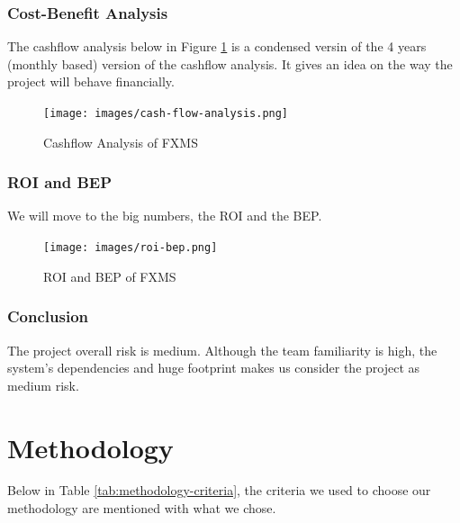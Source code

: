 \documentclass[a4paper]{report}
\begin{document}
\subsection{Cost-Benefit Analysis}

The cashflow analysis below in Figure \ref{fig:cash-flow-analysis} is a condensed versin of the 4 years (monthly based) version of the cashflow analysis. It gives an idea on the way the project will behave financially.

\begin{figure}[h!]
    \centering
    \texttt{[image: images/cash-flow-analysis.png]}
    \caption{Cashflow Analysis of FXMS}
    \label{fig:cash-flow-analysis}
\end{figure}

\subsection{ROI and BEP}

We will move to the big numbers, the ROI and the BEP.

\begin{figure}[h!]
    \centering
    \texttt{[image: images/roi-bep.png]}
    \caption{ROI and BEP of FXMS}
    \label{fig:roi-and-bep}
\end{figure}

\subsection{Conclusion}

The project overall risk is medium. Although the team familiarity is high, the system's dependencies and huge footprint makes us consider the project as medium risk.

\chapter{Methodology}

Below in Table \ref{tab:methodology-criteria}, the criteria we used to choose our methodology are mentioned with what we chose. 
\end{document}
